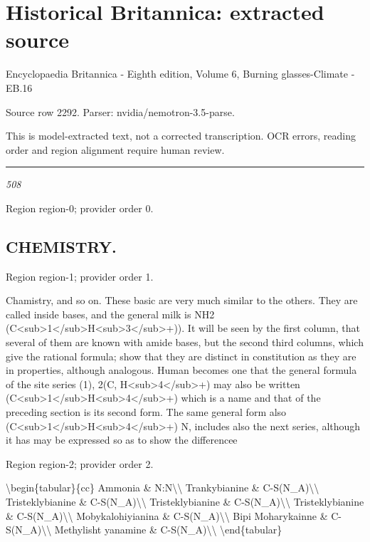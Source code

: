 \documentclass[11pt]{article}
\begin{document}
\section*{Historical Britannica: extracted source}
Encyclopaedia Britannica - Eighth edition, Volume 6, Burning glasses-Climate - EB.16\par
{\small Source row 2292. Parser: nvidia/nemotron-3.5-parse.\par}
{\small This is model-extracted text, not a corrected transcription. OCR errors, reading order and region alignment require human review.\par}
\hrule\medskip
{\small\itshape 508\par}

{\scriptsize\color{gray} Region region-0; provider order 0.\par}
\medskip

\subsection*{CHEMISTRY.}

{\scriptsize\color{gray} Region region-1; provider order 1.\par}
\medskip

Chamistry, and so on. These basic are very much similar to the others. They are called inside bases, and the general milk is NH2 (C<sub>1</sub>H<sub>3</sub>+)). It will be seen by the first column, that several of them are known with amide bases, but the second third columns, which give the rational formula; show that they are distinct in constitution as they are in properties, although analogous. Human becomes one that the general formula of the site series (1), 2(C, H<sub>4</sub>+) may also be written (C<sub>1</sub>H<sub>4</sub>+) which is a name and that of the preceding section is its second form. The same general form also (C<sub>1</sub>H<sub>4</sub>+) N, includes also the next series, although it has may be expressed so as to show the differencee
\par

{\scriptsize\color{gray} Region region-2; provider order 2.\par}
\medskip

\textbackslash{}begin\{tabular\}\{cc\}
Ammonia \& N:N\textbackslash{}\textbackslash{}
Trankybianine \& C-S(N\_A)\textbackslash{}\textbackslash{}
Tristeklybianine \& C-S(N\_A)\textbackslash{}\textbackslash{}
Tristeklybianine \& C-S(N\_A)\textbackslash{}\textbackslash{}
Tristeklybianine \& C-S(N\_A)\textbackslash{}\textbackslash{}
Mobykalohiyianina \& C-S(N\_A)\textbackslash{}\textbackslash{}
Bipi Moharykainne \& C-S(N\_A)\textbackslash{}\textbackslash{}
Methylisht yanamine \& C-S(N\_A)\textbackslash{}\textbackslash{}
\textbackslash{}end\{tabular\}
\par
\end{document}
